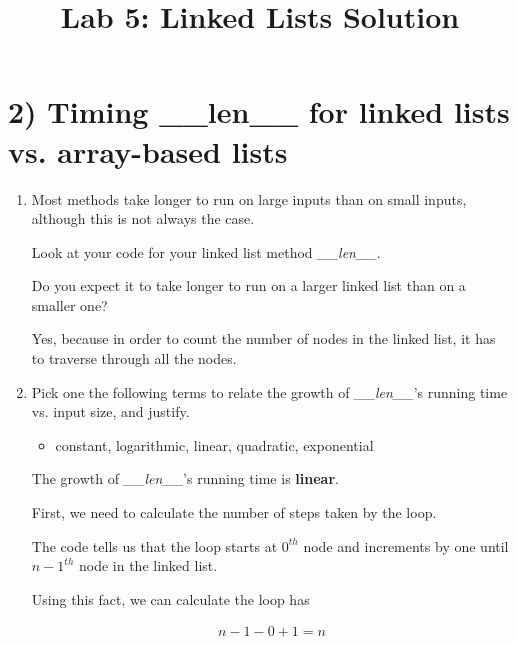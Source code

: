 \documentclass[12pt]{article}
\begin{document}
\title{Lab 5: Linked Lists Solution}
\date{}
\maketitle

\section*{2) Timing \_\_len\_\_ for linked lists vs. array-based lists}

\begin{enumerate}[1.]
    \item Most methods take longer to run on large inputs than on small inputs,
    although this is not always the case.

    \bigskip

    Look at your code for your linked list method \textit{\_\_len\_\_}.

    Do you expect it to take longer to run on a larger
    linked list than on a smaller one?

    \bigskip

    \begin{mdframed}
    Yes, because in order to count the number of nodes in the linked list,
    it has to traverse through all the nodes.
    \end{mdframed}

    \item Pick one the following terms to relate the growth of \textit{\_\_len\_\_}'s
    running time vs. input size, and justify.
    \begin{itemize}
        \item constant, logarithmic, linear, quadratic, exponential
    \end{itemize}

    \begin{mdframed}
    The growth of \textit{\_\_len\_\_}'s running time is \textbf{linear}.

    \bigskip

    First, we need to calculate the number of steps taken by the loop.

    \bigskip

    The code tells us that the loop starts at $0^{th}$ node and increments by
    one until $n-1^{th}$ node in the linked list.

    \bigskip

    Using this fact, we can calculate the loop has

    \begin{align}
        n - 1 - 0 + 1 = n
    \end{align}


\end{mdframed}
\end{enumerate}
\end{document}

